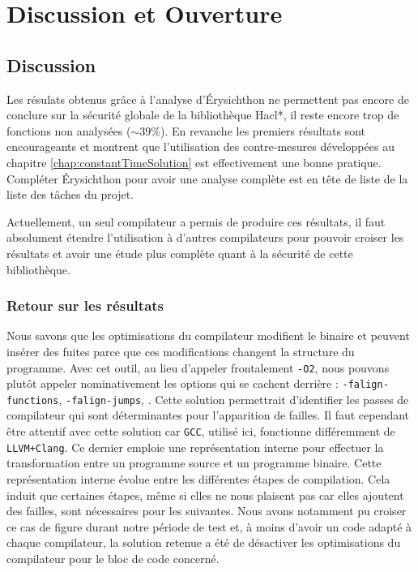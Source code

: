\chapter*{Discussion et Ouverture}

\section*{Discussion}


Les résulats obtenus grâce à l'analyse d'Érysichthon ne permettent pas encore de conclure sur la sécurité globale de la bibliothèque Hacl*, il reste encore trop de fonctions non analysées ($\sim 39\%$). En revanche les premiers résultats sont encourageants et montrent que l'utilisation des contre-mesures développées au chapitre \ref{chap:constantTimeSolution} est effectivement une bonne pratique. Compléter Érysichthon pour avoir une analyse complète est en tête de liste de la liste des tâches du projet.\medbreak

Actuellement, un seul compilateur a permis de produire ces résultats, il faut absolument étendre l'utilisation à d'autres compilateurs pour pouvoir croiser les résultats et avoir une étude plus complète quant à la sécurité de cette bibliothèque.\smallbreak

\subsection*{Retour sur les résultats}

Nous savons que les optimisations du compilateur modifient le binaire et peuvent insérer des fuites parce que ces modifications changent la structure du programme. Avec cet outil, au lieu d'appeler frontalement \texttt{-O2}, nous pouvons plutôt appeler nominativement les options qui se cachent derrière : \texttt{-falign-functions}, \texttt{-falign-jumps}, \etc. Cette solution permettrait d'identifier les passes de compilateur qui sont déterminantes pour l'apparition de failles. Il faut cependant être attentif avec cette solution car \texttt{GCC}, utilisé ici, fonctionne différemment de \texttt{LLVM+Clang}. Ce dernier emploie une représentation interne pour effectuer la transformation entre un programme source et un programme binaire. Cette représentation interne évolue entre les différentes étapes de compilation. Cela induit que certaines étapes, même si elles ne nous plaisent pas car elles ajoutent des failles, sont nécessaires pour les suivantes. Nous avons notamment pu croiser ce cas de figure durant notre période de test et, à moins d'avoir un code adapté à chaque compilateur, la solution retenue a été de désactiver les optimisations du compilateur pour le bloc de code concerné.\medbreak

